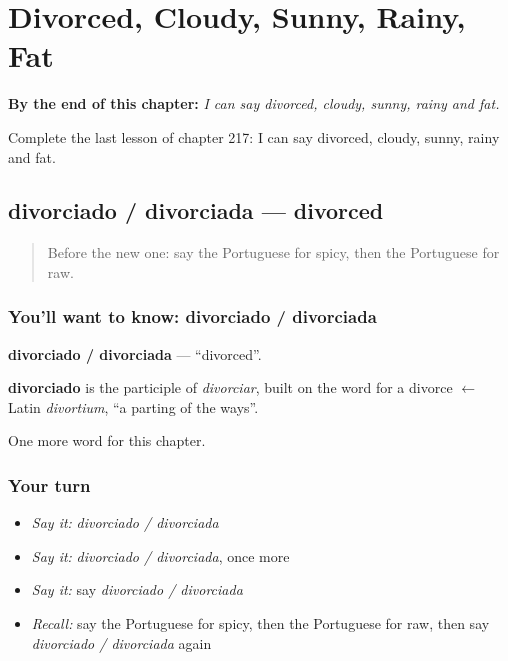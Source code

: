 
\chapter{Divorced, Cloudy, Sunny, Rainy, Fat}
\label{ch:pt-divorced-cloudy-sunny-rainy-fat}

\begin{chapteropening}
\textbf{By the end of this chapter:} \emph{I can say divorced, cloudy, sunny, rainy and fat.}

Complete the last lesson of chapter 217: I can say divorced, cloudy, sunny, rainy and fat.
\end{chapteropening}

\section[divorciado / divorciada]{divorciado / divorciada — divorced}

\label{lesson:PT-C217-divorciado-divorciada}



\begin{quote}
Before the new one: say the Portuguese for spicy, then the Portuguese for raw.
\end{quote}

\subsection*{You'll want to know: divorciado / divorciada}
\textbf{divorciado / divorciada} — \textquotedblleft{}divorced\textquotedblright{}.

\begin{cousinweb}
\textbf{divorciado} is the participle of \emph{divorciar}, built on the word for a divorce $\leftarrow$ Latin \emph{divortium}, \textquotedblleft{}a parting of the ways\textquotedblright{}.
\end{cousinweb}

\begin{grammarlens}[title={What you've built}]
One more word for this chapter.
\end{grammarlens}

\subsection*{Your turn}
\begin{itemize}
\raggedright
  \item \emph{Say it:} \emph{divorciado / divorciada}
  \item \emph{Say it:} \emph{divorciado / divorciada}, once more
  \item \emph{Say it:} say \emph{divorciado / divorciada}
  \item \emph{Recall:} say the Portuguese for spicy, then the Portuguese for raw, then say \emph{divorciado / divorciada} again
\end{itemize}


